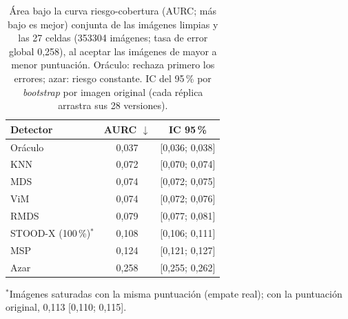 \begin{table}[tbp]
\centering
\footnotesize
\setlength{\tabcolsep}{4pt}
\caption{Área bajo la curva riesgo-cobertura (AURC; más bajo es mejor) conjunta de las imágenes limpias y las 27 celdas (\num{353304} imágenes; tasa de error global 0{,}258), al aceptar las imágenes de mayor a menor puntuación. Oráculo: rechaza primero los errores; azar: riesgo constante. IC del 95\,\% por \emph{bootstrap} por imagen original (cada réplica arrastra sus 28 versiones).}
\label{tab:ood-corr-aurc}
\begin{tabular}{lcc}
\toprule
Detector & AURC $\downarrow$ & IC 95\,\% \\
\midrule
Oráculo & 0{,}037 & [0{,}036; 0{,}038] \\
\midrule
KNN & 0{,}072 & [0{,}070; 0{,}074] \\
MDS & 0{,}074 & [0{,}072; 0{,}075] \\
ViM & 0{,}074 & [0{,}072; 0{,}076] \\
RMDS & 0{,}079 & [0{,}077; 0{,}081] \\
STOOD-X (100\,\%)$^{\ast}$ & 0{,}108 & [0{,}106; 0{,}111] \\
MSP & 0{,}124 & [0{,}121; 0{,}127] \\
\midrule
Azar & 0{,}258 & [0{,}255; 0{,}262] \\
\bottomrule
\end{tabular}

\smallskip
\parbox{\linewidth}{\scriptsize $^{\ast}$Imágenes saturadas con la misma puntuación (empate real); con la puntuación original, 0{,}113 [0{,}110; 0{,}115].}
\end{table}
